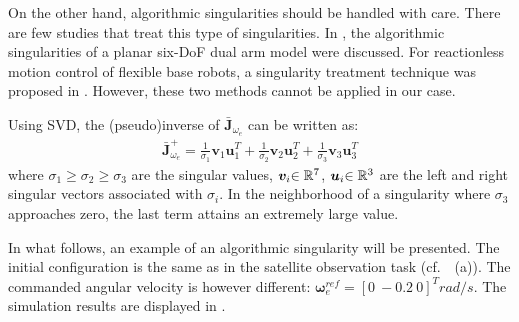 On the other hand,  algorithmic singularities should be handled with care.
There are few studies that treat this type of singularities.
In \cite{Agrawal1995}, the algorithmic singularities of a planar six-DoF dual arm model were discussed.
For reactionless motion control of flexible base robots,
a singularity treatment technique was proposed in \cite{Hara2010}.
However, these two methods cannot be applied in our case.

Using SVD, the (pseudo)inverse of $\bar{\bm{J}}_{\omega_{e}}$ can be written as:
%
\begin{align}
  \bar{\bm{J}}_{\omega_{e}}^{+} = \frac{1}{\sigma_{1}}\bm{v}_{1}\bm{u}_{1}^{T} + 
  \frac{1}{\sigma_{2}}\bm{v}_{2}\bm{u}_{2}^{T} + 
  \frac{1}{\sigma_{3}}\bm{v}_{3}\bm{u}_{3}^{T}\label{eq:JP_SVD}
\end{align}
%
where  $\sigma_{1} \geq \sigma_{2} \geq \sigma_{3}$ are the singular values,
$\bm{v}_{i}{\in\mathbb{R}^{7}}$, $\bm{u}_{i}{\in\mathbb{R}^{3}}$ are the left and right singular vectors
associated with $\sigma_{i}$. In the neighborhood of a singularity where $\sigma_{3}$ approaches zero,
the last term attains an extremely large value.

In what follows, an example of an algorithmic singularity will be presented.
The initial configuration is the same as  in the satellite observation task (cf.\ ~(a)).
The commanded angular velocity is however different:  $\bm{\omega}_{e}^{ref} = [0~-0.2~0]^{T}\unit{rad/s}$.
The simulation results are displayed in .

